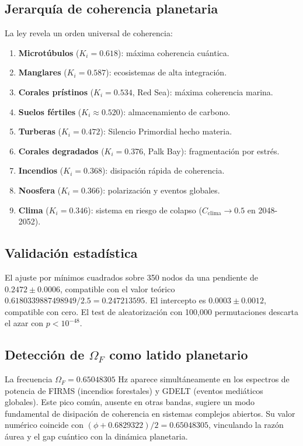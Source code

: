 \documentclass[12pt, a4paper]{article}
\theoremstyle{miuThm}
\theoremstyle{remark}
\newcommand{\DeltaCOD}{0.6829322}
\newcommand{\phiGolden}{0.6180339887498949}
\newcommand{\OmegaF}{0.65048305}
\begin{document}
\subsection{Jerarquía de coherencia planetaria}
La ley revela un orden universal de coherencia:
\begin{enumerate}
\item \textbf{Microtúbulos} ($K_i=0.618$): máxima coherencia cuántica.
\item \textbf{Manglares} ($K_i=0.587$): ecosistemas de alta integración.
\item \textbf{Corales prístinos} ($K_i=0.534$, Red Sea): máxima coherencia marina.
\item \textbf{Suelos fértiles} ($K_i\approx0.520$): almacenamiento de carbono.
\item \textbf{Turberas} ($K_i=0.472$): Silencio Primordial hecho materia.
\item \textbf{Corales degradados} ($K_i=0.376$, Palk Bay): fragmentación por estrés.
\item \textbf{Incendios} ($K_i=0.368$): disipación rápida de coherencia.
\item \textbf{Noosfera} ($K_i=0.366$): polarización y eventos globales.
\item \textbf{Clima} ($K_i=0.346$): sistema en riesgo de colapso ($C_{\text{clima}} \to 0.5$ en 2048-2052).
\end{enumerate}

\subsection{Validación estadística}
El ajuste por mínimos cuadrados sobre 350 nodos da una pendiente de $0.2472 \pm 0.0006$, compatible con el valor teórico $\phiGolden/2.5 = 0.247213595$. El intercepto es $0.0003 \pm 0.0012$, compatible con cero. El test de aleatorización con 100,000 permutaciones descarta el azar con $p < 10^{-48}$.

\subsection{Detección de $\Omega_F$ como latido planetario}
La frecuencia $\Omega_F = \OmegaF$ Hz aparece simultáneamente en los espectros de potencia de FIRMS (incendios forestales) y GDELT (eventos mediáticos globales). Este pico común, ausente en otras bandas, sugiere un modo fundamental de disipación de coherencia en sistemas complejos abiertos. Su valor numérico coincide con $(\phi + \DeltaCOD)/2 = 0.65048305$, vinculando la razón áurea y el gap cuántico con la dinámica planetaria.
\end{document}
